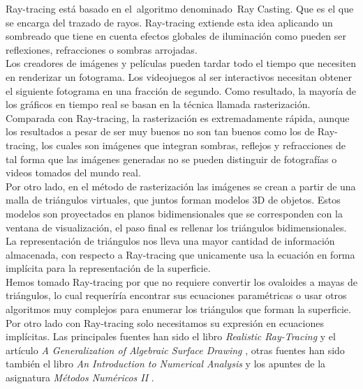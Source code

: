 Ray-tracing está basado en el algoritmo denominado Ray Casting. Que es el que se encarga del trazado de rayos. Ray-tracing extiende esta idea aplicando un sombreado que tiene en cuenta efectos globales de iluminación como pueden ser reflexiones, refracciones o sombras arrojadas.
${ }$\\

Los creadores de imágenes y películas pueden tardar todo el tiempo que necesiten en renderizar un fotograma. Los videojuegos al ser interactivos necesitan obtener el siguiente fotograma en una fracción de segundo. Como resultado, la mayoría de los gráficos en tiempo real se basan en la técnica llamada rasterización. 
${ }$\\

Comparada con Ray-tracing, la rasterización es extremadamente rápida, aunque los resultados a pesar de ser muy buenos no son tan buenos como los de Ray-tracing, los cuales son imágenes que integran sombras, reflejos y refracciones de tal forma que las imágenes generadas no se pueden distinguir de fotografías o videos tomados del mundo real.
${ }$\\

Por otro lado, en el método de rasterización las imágenes se crean a partir de una malla de triángulos virtuales, que juntos forman modelos 3D de objetos. Estos modelos son proyectados en planos bidimensionales que se corresponden con la ventana de visualización, el paso final es rellenar los triángulos bidimensionales. La representación de triángulos nos lleva una mayor cantidad de información almacenada, con respecto a Ray-tracing que unicamente usa la ecuación en forma implícita para la representación de la superficie.
${ }$\\

Hemos tomado Ray-tracing por que no requiere convertir los ovaloides a mayas de triángulos, lo cual requeríría encontrar sus ecuaciones paramétricas o usar otros algoritmos muy complejos para enumerar los triángulos que forman la superficie. Por otro lado con Ray-tracing solo necesitamos su expresión en ecuaciones implícitas. Las principales fuentes han sido el libro \textit{Realistic Ray-Tracing} \cite{Shirley} y el artículo \textit{A Generalization of Algebraic Surface Drawing} \cite{Blinn}, otras fuentes han sido también el libro \textit{An Introduction to Numerical Analysis} \cite{Atkinson} y los apuntes de la asignatura \textit{Métodos Numéricos II} \cite{CarmenS}.
${ }$\\




